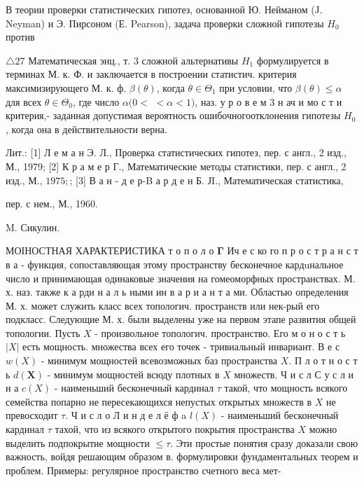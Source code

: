 \documentclass[10pt]{article}
\begin{document}
В теории проверки статистических гипотез, основанной Ю. Нейманом (J. Neyman) и Э. Пирсоном (Е. Pearson), задача проверки сложной гипотезы $H_{0}$ против



$\triangle 27$ Математическая энц., т. 3 сложной альтернативы $H_{1}$ формулируется в терминах М. к. Ф. и заключается в построении статистич. критерия максимизирующего М. к. ф. $\beta(\theta)$, когда $\theta \in \Theta_{1}$ при условии, что $\beta(\theta) \leqslant \alpha$ для всех $\theta \in \Theta_{0}$, где число $\alpha(0<$ $<\alpha<1)$, наз. у р о в е м 3 н ач и мо с т и критерия,- заданная допустимая вероятность ошибочногоотклонения гипотезы $H_{0}$, когда она в действительности верна.



Лит.: [1] Л е м а н Э. Л., Проверка статистических гипотез, пер. с англ., 2 изд., М., 1979; [2] К р а м е р Г., Математические методы статистики, пер. с англ., 2 изд., М., $1975 ;$; [3] В а н - д е р-B а р д е н Б. ЈI., Математическая статистика,

пер. с нем., М., 1960.

M. Сикулин.



МОІНОСТНАЯ ХАРАКТЕРИСТИКА т о п $о$ л $о$ $\boldsymbol{\Gamma}$ Ич е с ко го п р о с т р а н с т в а - функция, сопоставляющая этому пространству бесконечное кардuнальное число и принимающая одинаковые значения на гомеоморфных пространствах. М. х. наз. также к а рди н а л ь ными ин в а р и а н т а ми. Областью определения М. х. может служить класс всех топологич. пространств или нек-рый его подкласс. Следующие М. х. были выделены уже на первом этапе развития общей топологии. Пусть $X$ - произвольное топологич. пространство. Его м о н о с т ь $|X|$ есть мощность. множества всех его точек - тривиальный инвариант. В е с $w(X)$ - минимум мощностей всевозможных баз пространства $X$. П л о т н о с т ь $d(\boldsymbol{X})$ - минимум мощностей всюду плотных в $X$ множеств. Ч и с л С у с л и н а $c(X)$ - наименьший бесконечный кардинал $\tau$ такой, что мощность всякого семейства попарно не пересекающихся непустых открытых множеств в $X$ не превосходит $\tau$. Ч и с л о Л и н д е л ё ф a $l(X)$ - наименьший бесконечный кардинал $\tau$ тахой, что из всякого открытого покрытия пространства $X$ можно выделить подпокрытие мощности $\leqslant \tau$. Эти простые понятия сразу доказали свою важность, войдя решающим образом в. формулировки фундаментальных теорем и проблем. Примеры: регулярное пространство счетного веса мет-
\end{document}
